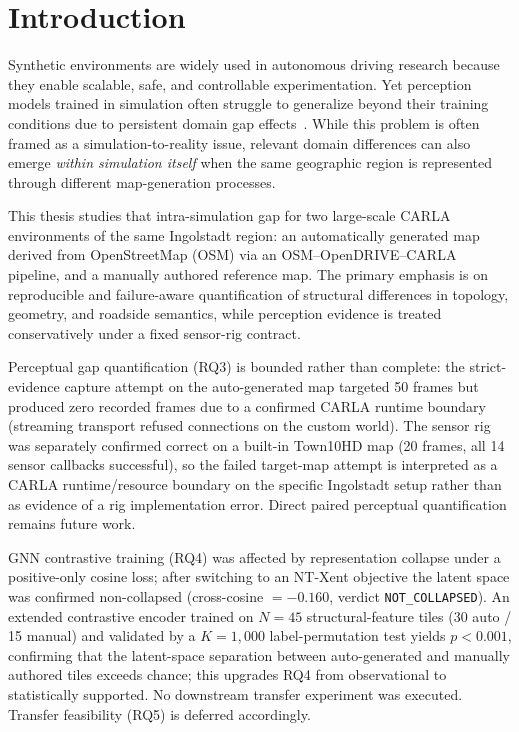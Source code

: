 \section{Introduction}
\label{sec:introduction}


Synthetic environments are widely used in autonomous driving research because they enable scalable, safe, and controllable experimentation. Yet perception models trained in simulation often struggle to generalize beyond their training conditions due to persistent domain gap effects~\cite{bai2023bridging}. While this problem is often framed as a simulation-to-reality issue, relevant domain differences can also emerge \emph{within simulation itself} when the same geographic region is represented through different map-generation processes.

This thesis studies that intra-simulation gap for two large-scale CARLA environments of the same Ingolstadt region: an automatically generated map derived from OpenStreetMap (OSM) via an OSM--OpenDRIVE--CARLA pipeline, and a manually authored reference map. The primary emphasis is on reproducible and failure-aware quantification of structural differences in topology, geometry, and roadside semantics, while perception evidence is treated conservatively under a fixed sensor-rig contract.

Perceptual gap quantification (RQ3) is bounded rather than complete: the strict-evidence capture attempt on the auto-generated map targeted 50 frames but produced zero recorded frames due to a confirmed CARLA runtime boundary (streaming transport refused connections on the custom world). The sensor rig was separately confirmed correct on a built-in Town10HD map (20 frames, all 14 sensor callbacks successful), so the failed target-map attempt is interpreted as a CARLA runtime/resource boundary on the specific Ingolstadt setup rather than as evidence of a rig implementation error. Direct paired perceptual quantification remains future work.

GNN contrastive training (RQ4) was affected by representation collapse under a positive-only cosine loss; after switching to an NT-Xent objective the latent space was confirmed non-collapsed (cross-cosine $= -0.160$, verdict \texttt{NOT\_COLLAPSED}). An extended contrastive encoder trained on $N=45$ structural-feature tiles (30 auto / 15 manual) and validated by a $K=1{,}000$ label-permutation test yields $p<0.001$, confirming that the latent-space separation between auto-generated and manually authored tiles exceeds chance; this upgrades RQ4 from observational to statistically supported. No downstream transfer experiment was executed. Transfer feasibility (RQ5) is deferred accordingly.

